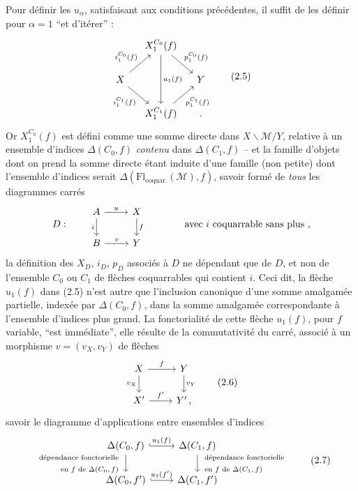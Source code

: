 \documentclass[11pt]{article}
\newcommand{\printedpage}[1]{\marginpar{\footnotesize p.~#1}}
\newcommand{\msp}[1]{\marginpar{\footnotesize [#1]}}
\newcommand{\Fl}{\mathrm{Fl}}
\newcommand{\cM}{\mathcal{M}}
\begin{document}
Pour définir les $u_\alpha$, satisfaisant aux conditions précédentes, il suffit de les définir pour $\alpha=1$ ``et d'itérer'' :
\[
\begin{tikzcd}[column sep=small]
& X_1^{C_0}(f) \arrow[dd, "u_1(f)"] \arrow[dr, "p_1^{C_0}(f)"] & \\
X \arrow[ur, "i_1^{C_0}(f)"] \arrow[dr, "i_1^{C_1}(f)"'] & & Y \\
& X_1^{C_1}(f) \arrow[ur, "p_1^{C_1}(f)"'] & {}.
\end{tikzcd}
\tag*{(2.5)}
\]
Or $X_1^{C_0}(f)$ est défini comme une somme directe dans $X\backslash\cM/Y$, relative à un ensemble d'indices $\Delta(C_0,f)$ \textit{contenu} dans $\Delta(C_1,f)$ -- et la famille d'objets dont on prend la somme directe étant induite d'une famille (non petite) dont l'ensemble d'indices serait $\Delta(\Fl_{\text{coquar.}}(\cM),f)$, savoir formé de \textit{tous} les diagrammes carrés
\printedpage{11}
\[
D : \qquad
\begin{tikzcd}
A \arrow[r, "u"] \arrow[d, "i"'] & X \arrow[d, "f"] \\
B \arrow[r, "v"] & Y
\end{tikzcd}
\qquad\qquad \text{avec $i$ coquarrable sans plus ,}
\]
la définition des $X_D$, $i_D$, $p_D$ associés à $D$ ne dépendant que de $D$, et non de l'ensemble $C_0$ ou $C_1$ de flèches coquarrables qui contient $i$. Ceci dit, la flèche $u_1(f)$
\msp{page 15}
dans (2.5) n'est autre que l'inclusion canonique d'une somme amalgamée partielle, indexée par $\Delta(C_0,f)$, dans la somme amalgamée correspondante à l'ensemble d'indices plus grand. La fonctorialité de cette flèche $u_1(f)$, pour $f$ variable, ``est immédiate'', elle résulte de la commutativité du carré, associé à un morphisme $v=(v_X,v_Y)$ de flèches
\[
\begin{tikzcd}
X \arrow[r, "f"] \arrow[d, "v_X"'] & Y \arrow[d, "v_Y"] \\
X' \arrow[r, "f'"] & Y'\,,
\end{tikzcd}
\tag*{(2.6)}
\]
savoir le diagramme d'applications entre ensembles d'indices
\[
\begin{tikzcd}
\Delta(C_0,f) \arrow[r, hook, "u_1(f)"] \arrow[d, "{\begin{array}{r}\text{dépendance fonctorielle}\\ \text{en $f$ de $\Delta(C_0,f)$}\end{array}}"'] & \Delta(C_1,f) \arrow[d, "{\begin{array}{l}\text{dépendance fonctorielle}\\ \text{en $f$ de $\Delta(C_1,f)$}\end{array}}"] \\
\Delta(C_0,f') \arrow[r, hook, "u_1(f')"] & \Delta(C_1,f')
\end{tikzcd}
\tag*{(2.7)}
\]
\end{document}
